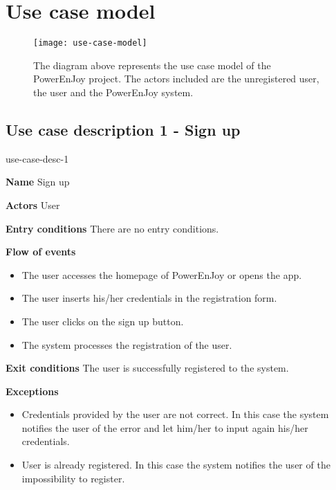 \section{Use case model}

\begin{figure}[H]
	\centering
	\texttt{[image: use-case-model]}
	\caption[Use case model]{The diagram above represents the use case model of the PowerEnJoy project. The actors included are the unregistered user, the user and the PowerEnJoy system.}
	\label{fig:use-case-model}
\end{figure}

\subsection{Use case description 1 - Sign up}
\begin{labeling}{use-case-desc-1}
		\item[\textbf{Name}] Sign up
		\item[\textbf{Actors}] User
		\item[\textbf{Entry conditions}] There are no entry conditions.
		\item[\textbf{Flow of events}]
			\begin{itemize}
				\item[]
				\item The user accesses the homepage of PowerEnJoy or opens the app.
				\item The user inserts his/her credentials in the registration form.
				\item The user clicks on the sign up button.
				\item The system processes the registration of the user.
			\end{itemize}
		\item[\textbf{Exit conditions}] The user is successfully registered to the system.
		\item[\textbf{Exceptions}]
			\begin{itemize}
				\item[]
				\item Credentials provided by the user are not correct. In this case the system notifies the user of the error and let him/her to input again his/her credentials. 
				\item User is already registered. In this case the system notifies the user of the impossibility to register.
			\end{itemize}
	\end{labeling}

